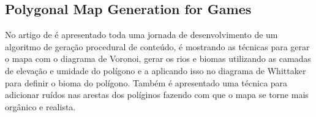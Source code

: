  \subsection*{Polygonal Map Generation for Games}

 No artigo de  é apresentado toda uma jornada de desenvolvimento de um algoritmo de geração procedural de conteúdo, é mostrando as técnicas para gerar o mapa com o diagrama de Voronoi, gerar os rios e biomas utilizando as camadas de elevação e umidade do polígono e a aplicando isso no diagrama de Whittaker para definir o bioma do polígono. Também é apresentado uma técnica para adicionar ruídos nas arestas dos políginos fazendo com que o mapa se torne mais orgânico e realista.